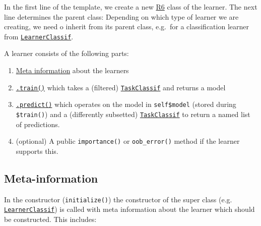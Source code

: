 \documentclass[]{scrbook}
\providecommand{\tightlist}{%
  \setlength{\itemsep}{0pt}\setlength{\parskip}{0pt}}
\begin{document}
In the first line of the template, we create a new \href{https://cran.r-project.org/package=R6}{R6} class of the learner.
The next line determines the parent class:
Depending on which type of learner we are creating, we need o inherit from its parent class, e.g.~for a classification learner from \href{https://mlr3.mlr-org.com/reference/LearnerClassif.html}{\texttt{LearnerClassif}}.

A learner consists of the following parts:

\begin{enumerate}
\def\labelenumi{\arabic{enumi}.}
\tightlist
\item
  \protect\hyperlink{learner-meta-information}{Meta information} about the learners
\item
  \protect\hyperlink{learner-train}{\texttt{.train()}} which takes a (filtered) \href{https://mlr3.mlr-org.com/reference/TaskClassif.html}{\texttt{TaskClassif}} and returns a model
\item
  \protect\hyperlink{learner-predict}{\texttt{.predict()}} which operates on the model in \texttt{self\$model} (stored during \texttt{\$train()}) and a (differently subsetted) \href{https://mlr3.mlr-org.com/reference/TaskClassif.html}{\texttt{TaskClassif}} to return a named list of predictions.
\item
  (optional) A public \texttt{importance()} or \texttt{oob\_error()} method if the learner supports this.
\end{enumerate}

\hypertarget{learner-meta-information}{%
\subsection{Meta-information}\label{learner-meta-information}}

In the constructor (\texttt{initialize()}) the constructor of the super class (e.g. \href{https://mlr3.mlr-org.com/reference/LearnerClassif.html}{\texttt{LearnerClassif}}) is called with meta information about the learner which should be constructed.
This includes:
\end{document}
